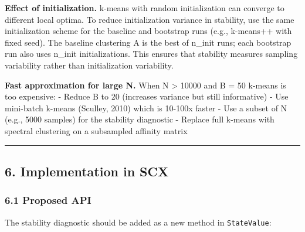 \documentclass[
  12pt,
]{ctexart}
\begin{document}
\textbf{Effect of initialization.} k-means with random initialization
can converge to different local optima. To reduce initialization
variance in stability, use the same initialization scheme for the
baseline and bootstrap runs (e.g., k-means++ with fixed seed). The
baseline clustering A is the best of n\_init runs; each bootstrap run
also uses n\_init initializations. This ensures that stability measures
sampling variability rather than initialization variability.

\textbf{Fast approximation for large N.} When N \textgreater{} 10000 and
B = 50 k-means is too expensive: - Reduce B to 20 (increases variance
but still informative) - Use mini-batch k-means (Sculley, 2010) which is
10-100x faster - Use a subset of N (e.g., 5000 samples) for the
stability diagnostic - Replace full k-means with spectral clustering on
a subsampled affinity matrix

\begin{center}\rule{0.5\linewidth}{0.5pt}\end{center}

\subsection{6. Implementation in SCX}\label{implementation-in-scx}

\subsubsection{6.1 Proposed API}\label{proposed-api}

The stability diagnostic should be added as a new method in
\texttt{StateValue}:
\end{document}
